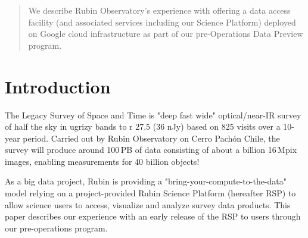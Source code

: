\documentclass[11pt,twoside]{article}
\begin{document}


\begin{abstract}

We describe Rubin Observatory's experience with offering a data access facility (and associated services including our Science Platform) deployed on Google cloud infrastructure as part of our pre-Operations Data Preview program.
\end{abstract}

\section{Introduction}

The Legacy Survey of Space and Time \citep{2019ApJ...873..111I} is "deep fast wide" optical/near-IR survey of half the sky in ugrizy bands to r 27.5 (36 nJy) based on 825 visits over a 10-year period.
Carried out by Rubin Observatory on Cerro Pach\'{o}n Chile, the survey will produce around 100\,PB of data consisting of about a billion 16\,Mpix images, enabling measurements for 40 billion objects!

As a big data project, Rubin is providing a "bring-your-compute-to-the-data" model relying on a project-provided Rubin Science Platform (hereafter RSP) to allow science users to access, visualize and analyze survey data products.
This paper describes our experience with an early release of the RSP to users through our pre-operations program.
\end{document}
